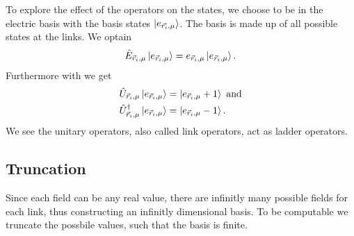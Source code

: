 To explore the effect of the operators on the states, we choose to be in the electric basis with the basis states $\ket{e_{\vec{r_i}, \mu}}$. The basis is made up of all possible states at the links. We optain
\begin{align}
  \hat{E}_{\vec{r}_{i}, \mu}\ket{e_{\vec{r}_{i}, \mu}}=e_{\vec{r}_{i}, \mu}\ket{e_{\vec{r}_{i}, \mu}}.\label{eq:eig}
\end{align}
Furthermore with  we get
\begin{align}
  \hat{U}_{\vec{r}_{i}, \mu}\ket{e_{\vec{r}_{i}, \mu}}      & =\ket{e_{\vec{r}_{i}, \mu}+1}\text{ and}\label{eq:eigu1} \\
  \hat{U}_{\vec{r}_{i}, \mu}^\dag\ket{e_{\vec{r}_{i}, \mu}} & =\ket{e_{\vec{r}_{i}, \mu}-1}.\label{eq:eigu2}
\end{align}
We see the unitary operators, also called link operators, act as ladder operators.
\subsection{Truncation}
Since each field can be any real value, there are infinitly many possible fields for each link, thus constructing an infinitly dimensional basis. To be computable we truncate the possbile values, such that the basis is finite.

